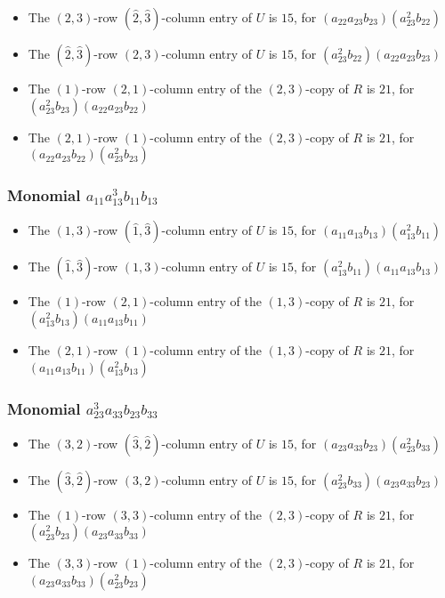 \documentclass{article}
\begin{document}
\begin{itemize}
\item The $ \left(2, 3\right) $-row $ (\hat{2}, \hat{3}) $-column entry of $U$ is $ 15 $, for $( a_{22} a_{23} b_{23} )( a_{23}^{2} b_{22} )$ 
\item The $(\hat{2}, \hat{3})$-row $ \left(2, 3\right) $-column entry of $U$ is $ 15 $, for $( a_{23}^{2} b_{22} )( a_{22} a_{23} b_{23} )$ 
\item The $(1)$-row $(2, 1)$-column entry of the $ \left(2, 3\right) $-copy of $R$ is $ 21 $, for $( a_{23}^{2} b_{23} )( a_{22} a_{23} b_{22} )$ 
\item The $(2, 1)$-row $(1)$-column entry of the $ \left(2, 3\right) $-copy of $R$ is $ 21 $, for $( a_{22} a_{23} b_{22} )( a_{23}^{2} b_{23} )$ 
\end{itemize}
\subsubsection{Monomial $ a_{11} a_{13}^{3} b_{11} b_{13} $}

\begin{itemize}
\item The $ \left(1, 3\right) $-row $ (\hat{1}, \hat{3}) $-column entry of $U$ is $ 15 $, for $( a_{11} a_{13} b_{13} )( a_{13}^{2} b_{11} )$ 
\item The $(\hat{1}, \hat{3})$-row $ \left(1, 3\right) $-column entry of $U$ is $ 15 $, for $( a_{13}^{2} b_{11} )( a_{11} a_{13} b_{13} )$ 
\item The $(1)$-row $(2, 1)$-column entry of the $ \left(1, 3\right) $-copy of $R$ is $ 21 $, for $( a_{13}^{2} b_{13} )( a_{11} a_{13} b_{11} )$ 
\item The $(2, 1)$-row $(1)$-column entry of the $ \left(1, 3\right) $-copy of $R$ is $ 21 $, for $( a_{11} a_{13} b_{11} )( a_{13}^{2} b_{13} )$ 
\end{itemize}
\subsubsection{Monomial $ a_{23}^{3} a_{33} b_{23} b_{33} $}

\begin{itemize}
\item The $ \left(3, 2\right) $-row $ (\hat{3}, \hat{2}) $-column entry of $U$ is $ 15 $, for $( a_{23} a_{33} b_{23} )( a_{23}^{2} b_{33} )$ 
\item The $(\hat{3}, \hat{2})$-row $ \left(3, 2\right) $-column entry of $U$ is $ 15 $, for $( a_{23}^{2} b_{33} )( a_{23} a_{33} b_{23} )$ 
\item The $(1)$-row $(3, 3)$-column entry of the $ \left(2, 3\right) $-copy of $R$ is $ 21 $, for $( a_{23}^{2} b_{23} )( a_{23} a_{33} b_{33} )$ 
\item The $(3, 3)$-row $(1)$-column entry of the $ \left(2, 3\right) $-copy of $R$ is $ 21 $, for $( a_{23} a_{33} b_{33} )( a_{23}^{2} b_{23} )$ 
\end{itemize}
\end{document}

